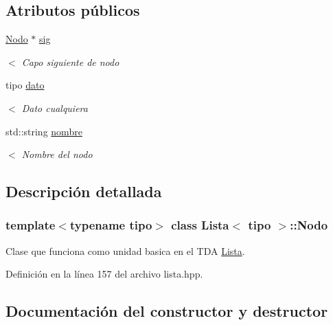 \subsection*{Atributos públicos}
\begin{DoxyCompactItemize}
\item 
\mbox{\label{classLista_1_1Nodo_a8594ea833e1be652cb7a9b8be66bf97d}} 
\hyperlink{classLista_1_1Nodo}{Nodo} $\ast$ \hyperlink{classLista_1_1Nodo_a8594ea833e1be652cb7a9b8be66bf97d}{sig}
\begin{DoxyCompactList}\small\item\em $<$ Capo siguiente de nodo \end{DoxyCompactList}\item 
\mbox{\label{classLista_1_1Nodo_ae3e8f0073984b0791ba94590ea9e2c9f}} 
tipo \hyperlink{classLista_1_1Nodo_ae3e8f0073984b0791ba94590ea9e2c9f}{dato}
\begin{DoxyCompactList}\small\item\em $<$ Dato cualquiera \end{DoxyCompactList}\item 
\mbox{\label{classLista_1_1Nodo_ab6ad6f5015b5e8acd5f82ca3701eb804}} 
std\+::string \hyperlink{classLista_1_1Nodo_ab6ad6f5015b5e8acd5f82ca3701eb804}{nombre}
\begin{DoxyCompactList}\small\item\em $<$ Nombre del nodo \end{DoxyCompactList}\end{DoxyCompactItemize}


\subsection{Descripción detallada}
\subsubsection*{template$<$typename tipo$>$\newline
class Lista$<$ tipo $>$\+::\+Nodo}

Clase que funciona como unidad basica en el T\+DA \hyperlink{classLista}{Lista}. 

Definición en la línea 157 del archivo lista.\+hpp.



\subsection{Documentación del constructor y destructor}
\mbox{\label{classLista_1_1Nodo_a76d93da356c9904873c409f413737e58}} 
